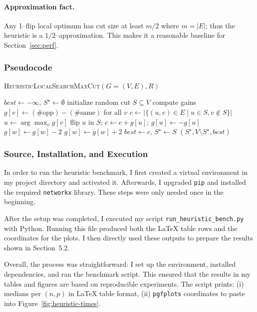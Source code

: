 \documentclass[12pt]{article}
\begin{document}
\paragraph{Approximation fact.}
Any 1–flip local optimum has cut size at least $m/2$ where $m=|E|$; thus the heuristic is a $1/2$–approximation. This makes it a reasonable baseline for Section~\ref{sec:perf}.

\subsubsection*{Pseudocode}
\begin{algorithm}[H]
\caption{\textsc{HeuristicLocalSearchMaxCut}$(G=(V,E), R)$}
\begin{algorithmic}[1]
\State $best \gets -\infty$, $S^\star \gets \emptyset$
  \State initialize random cut $S \subseteq V$
  \State compute gains $g[v] \gets (\#\text{opp})-(\#\text{same})$ for all $v$
  \State $c \gets |\{(u,v)\in E \mid u\in S, v\notin S\}|$
    \State $u \gets \arg\max_v g[v]$
    \State flip $u$ in $S$; $c \gets c + g[u]$; $g[u] \gets -g[u]$
       \State $g[w] \gets g[w] - 2$
      \Else \State $g[w] \gets g[w] + 2$
      \EndIf
    \EndFor
  \EndWhile
   \State $best \gets c$, $S^\star \gets S$
  \EndIf
\EndFor
\State \Return $(S^\star, V\setminus S^\star, best)$
\end{algorithmic}
\end{algorithm}

\subsubsection*{Source, Installation, and Execution}
In order to run the heuristic benchmark, I first created a virtual environment in my project directory and activated it. Afterwards, I upgraded \texttt{pip} and installed the required \texttt{networkx} library. These steps were only needed once in the beginning.  

After the setup was completed, I executed my script \texttt{run\_heuristic\_bench.py} with Python. Running this file produced both the LaTeX table rows and the coordinates for the plots. I then directly used these outputs to prepare the results shown in Section~5.2.  

Overall, the process was straightforward: I set up the environment, installed dependencies, and ran the benchmark script. This ensured that the results in my tables and figures are based on reproducible experiments.
\noindent
The script prints: (i) medians per $(n,p)$ in LaTeX table format, (ii) \texttt{pgfplots} coordinates to paste into Figure~\ref{fig:heuristic-times}.
\end{document}
